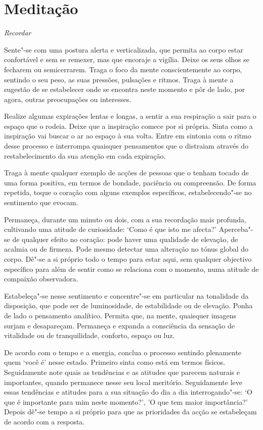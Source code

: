 \clearpage

\section[Meditação: recordar]{Meditação}

{\centering
\subSectionFont\selectfont
\textit{Recordar}
\par}

\bigskip

Sente"-se com uma postura alerta e verticalizada, que permita ao corpo estar
confortável e sem se remexer, mas que encoraje a vigília. Deixe os seus olhos se
fecharem ou semicerrarem. Traga o foco da mente conscientemente ao corpo,
sentindo o seu peso, as suas pressões, pulsações e ritmos. Traga à mente a
sugestão de se estabelecer onde se encontra neste momento e pôr de lado, por
agora, outras preocupações ou interesses.

Realize algumas expirações lentas e longas, a sentir a sua respiração a sair
para o espaço que o rodeia. Deixe que a inspiração comece por si própria. Sinta
como a inspiração vai buscar o ar ao espaço à sua volta. Entre em sintonia com o
ritmo desse processo e interrompa quaisquer pensamentos que o distraiam através
do restabelecimento da sua atenção em cada expiração.

Traga à mente qualquer exemplo de acções de pessoas que o tenham tocado de uma
forma positiva, em termos de bondade, paciência ou compreensão. De forma
repetida, toque o coração com alguns exemplos específicos, estabelecendo"-se no
sentimento que evocam.

Permaneça, durante um minuto ou dois, com a sua recordação mais profunda,
cultivando uma atitude de curiosidade: `Como é que isto me afecta?' Aperceba"-se
de qualquer efeito no coração: pode haver uma qualidade de elevação, de acalmia
ou de firmeza. Pode mesmo detectar uma alteração no tónus global do corpo. Dê"-se
a si próprio todo o tempo para estar aqui, sem qualquer objectivo específico
para além de sentir como se relaciona com o momento, numa atitude de compaixão
observadora.

Estabeleça"-se nesse sentimento e concentre"-se em particular na tonalidade da
disposição, que pode ser de luminosidade, de estabilidade ou de elevação. Ponha
de lado o pensamento analítico. Permita que, na mente, quaisquer imagens surjam
e desapareçam. Permaneça e expanda a consciência da sensação de vitalidade ou de
tranquilidade, conforto, espaço ou luz.

De acordo com o tempo e a energia, conclua o processo sentindo plenamente quem
`você é' nesse estado. Primeiro sinta como está em termos físicos. Seguidamente
note quais as tendências e as atitudes que parecem naturais e importantes,
quando permanece nesse seu local meritório. Seguidamente leve essas tendências e
atitudes para a sua situação do dia a dia interrogando"-se: `O que é importante
para mim neste momento?', 'O que tem maior importância?' Depois dê"-se tempo a si
próprio para que as prioridades da acção se estabeleçam de acordo com a
resposta.
